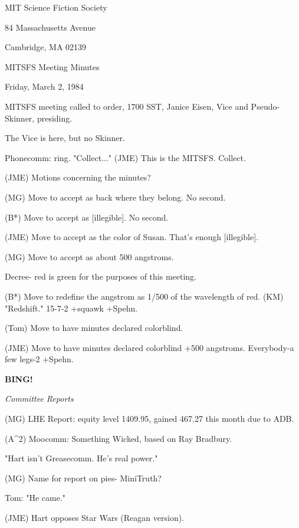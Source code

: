 \documentclass[12pt]{article}
\newcommand{\bing}{{\bf BING!} }
\newcommand{\goto}[1]{\bing \vskip 12pt \centerline{{\em{#1}}}}
\begin{document}
\begin{center}

MIT Science Fiction Society 

84 Massachusetts Avenue

Cambridge, MA 02139

\vspace{12pt}

MITSFS Meeting Minutes 

Friday, March 2, 1984

\end{center}
 
\vspace{18pt}

\setlength{\parskip}{6pt}

\noindent
MITSFS meeting called to order, 1700 SST,
Janice Eisen, Vice and Pseudo-Skinner, presiding.

The Vice is here, but no Skinner.

Phonecomm: ring. "Collect..." (JME) This is the MITSFS. Collect.

(JME) Motions concerning the minutes?

(MG) Move to accept as back where they belong. No second.

(B*) Move to accept as [illegible]. No second.

(JME) Move to accept as the color of Susan. That's enough [illegible].

(MG) Move to accept as about 500 angstroms.

Decree- red is green for the purposes of this meeting.

(B*) Move to redefine the angstrom as 1/500 of the wavelength of red. (KM) "Redshift." 15-7-2 +squawk +Spehn.

(Tom) Move to have minutes declared colorblind.

(JME) Move to have minutes declared colorblind +500 angstroms. Everybody-a few legs-2 +Spehn.

\goto{Committee Reports}

(MG) LHE Report: equity level 1409.95, gained 467.27 this month due to ADB.

(A^2) Moocomm: Something Wicked, based on Ray Bradbury.

"Hart isn't Greasecomm. He's real power."

(MG) Name for report on pies- MiniTruth?

Tom: "He came."

(JME) Hart opposes Star Wars (Reagan version).
\end{document}
